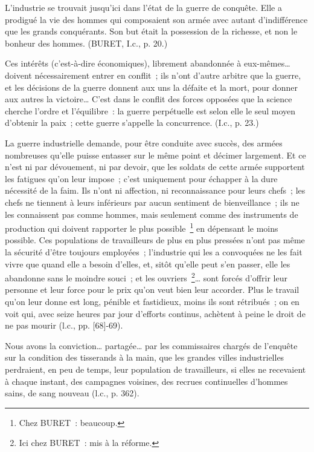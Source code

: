 \documentclass[french,twoside]{book} %
\newenvironment{quoteblock}%
  {\begin{quoting}}
  {\end{quoting}}
\newenvironment{quotebar}{%
    \def\FrameCommand{{\color{rubric!10!}\vrule width 0.5em} \hspace{0.9em}}%
    \def\OuterFrameSep{\itemsep} %
    \MakeFramed {\advance\hsize-\width \FrameRestore}
  }%
  {%
    \endMakeFramed
  }
\renewenvironment{quoteblock}%
  {%
    \savenotes
    \setstretch{0.9}
    \normalfont
    \begin{quotebar}
  }
  {%
    \end{quotebar}
    \spewnotes
  }
\begin{document}
\begin{quoteblock}
 \noindent L’industrie se trouvait jusqu’ici dans l’état de la guerre de conquête. Elle a prodigué la vie des hommes qui composaient son armée avec autant d’indifférence que les grands conquérants. Son but était la possession de la richesse, et non le bonheur des hommes. (BURET, I.c., p. 20.)\par
 Ces intérêts (c’est-à-dire économiques), librement abandonnée à eux-mêmes… doivent nécessairement entrer en conflit ; ils n’ont d’autre arbitre que la guerre, et les décisions de la guerre donnent aux uns la défaite et la mort, pour donner aux autres la victoire… C’est dans le conflit des forces opposées que la science cherche l’ordre et l’équilibre : la guerre perpétuelle est selon elle le seul moyen d’obtenir la paix ; cette guerre s’appelle la concurrence. (I.c., p. 23.)\par
 La guerre industrielle demande, pour être conduite avec succès, des armées nombreuses qu’elle puisse entasser sur le même point et décimer largement. Et ce n’est ni par dévouement, ni par devoir, que les soldats de cette armée supportent les fatigues qu’on leur impose ; c’est uniquement pour échapper à la dure nécessité de la faim. Ils n’ont ni affection, ni reconnaissance pour leurs chefs ; les chefs ne tiennent à leurs inférieurs par aucun sentiment de bienveillance ; ils ne les connaissent pas comme hommes, mais seulement comme des instruments de production qui doivent rapporter le plus possible \footnote{Chez BURET : beaucoup.} en dépensant le moins possible. Ces populations de travailleurs de plus en plus pressées n’ont pas même la sécurité d’être toujours employées ; l’industrie qui les a convoquées ne les fait vivre que quand elle a besoin d’elles, et, sitôt qu’elle peut s’en passer, elle les abandonne sans le moindre souci ; et les ouvriers \footnote{Ici chez BURET : mis à la réforme.}… sont forcés d’offrir leur personne et leur force pour le prix qu’on veut bien leur accorder. Plus le travail qu’on leur donne est long, pénible et fastidieux, moins ils sont rétribués ; on en voit qui, avec seize heures par jour d’efforts continus, achètent à peine le droit de ne pas mourir (l.c., pp. [68]-69).\par
 [XV] Nous avons la conviction… partagée… par les commissaires chargés de l’enquête sur la condition des tisserands à la main, que les grandes villes industrielles perdraient, en peu de temps, leur population de travailleurs, si elles ne recevaient à chaque instant, des campagnes voisines, des recrues continuelles d’hommes sains, de sang nouveau (l.c., p. 362).
 \end{quoteblock}
\end{document}
